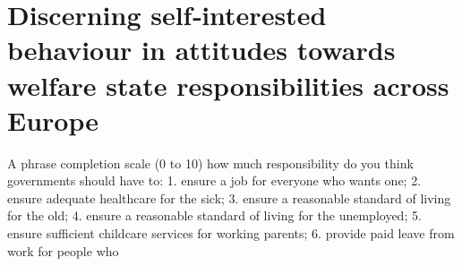 \section*{Discerning self‐interested behaviour in attitudes towards welfare state responsibilities across Europe \cite{baslevent_discerning_2011}}
A phrase completion scale (0 to 10)
 how much responsibility do you think governments should have to:
 1. ensure a job for everyone who wants one; 
 2. ensure adequate healthcare for the sick;
 3.  ensure a reasonable standard of living for the old; 
 4.  ensure a reasonable standard of living for the unemployed;
 5.  ensure sufficient childcare services for working parents; 
 6.  provide paid leave from work for people who
